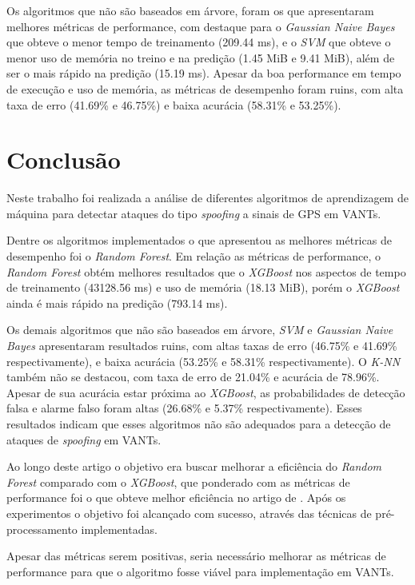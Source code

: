 \documentclass[12pt]{article}
\begin{document}
Os algoritmos que não são baseados em árvore, foram os que apresentaram
melhores métricas de performance, com destaque para o \textit{Gaussian Naive Bayes}
que obteve o menor tempo de treinamento (209.44 ms),
e o \textit{SVM} que obteve o menor uso de memória
no treino e na predição (1.45 MiB e 9.41 MiB), além de ser o mais rápido na predição (15.19 ms).
Apesar da boa performance em tempo de execução e uso de memória,
as métricas de desempenho foram ruins, com alta taxa de erro (41.69\% e 46.75\%)
e baixa acurácia (58.31\% e 53.25\%).

\section{Conclusão}

Neste trabalho foi realizada a análise de diferentes
algoritmos de aprendizagem de máquina
para detectar ataques do tipo \textit{spoofing}
a sinais de GPS em VANTs.

Dentre os algoritmos implementados o que apresentou as melhores métricas de desempenho
foi o \textit{Random Forest}.
Em relação as métricas de performance, o \textit{Random Forest} obtém melhores
resultados que o \textit{XGBoost} nos aspectos
de tempo de treinamento (43128.56 ms) e uso de memória (18.13 MiB), 
porém o \textit{XGBoost} ainda é mais rápido na predição (793.14 ms).

Os demais algoritmos que não são baseados em árvore,
\textit{SVM} e \textit{Gaussian Naive Bayes} apresentaram
resultados ruins, com altas taxas de erro (46.75\% e 41.69\% respectivamente),
e baixa acurácia (53.25\% e 58.31\% respectivamente).
O \textit{K-NN} também não se destacou, com
taxa de erro de 21.04\% e acurácia de 78.96\%.
Apesar de sua acurácia estar próxima ao \textit{XGBoost},
as probabilidades de detecção falsa e alarme falso
foram altas (26.68\% e 5.37\% respectivamente).
Esses resultados indicam que esses algoritmos não são adequados
para a detecção de ataques de \textit{spoofing} em VANTs.

Ao longo deste artigo o objetivo
era buscar melhorar a eficiência do \textit{Random Forest}
comparado com o \textit{XGBoost}, que ponderado com as métricas de performance
foi o que obteve melhor eficiência no artigo de \cite{Aissou2021}.
Após os experimentos o objetivo foi alcançado com sucesso, 
através das técnicas de pré-processamento implementadas.

Apesar das métricas serem positivas,
seria necessário melhorar as métricas de performance
para que o algoritmo fosse viável para implementação em VANTs.
\end{document}
